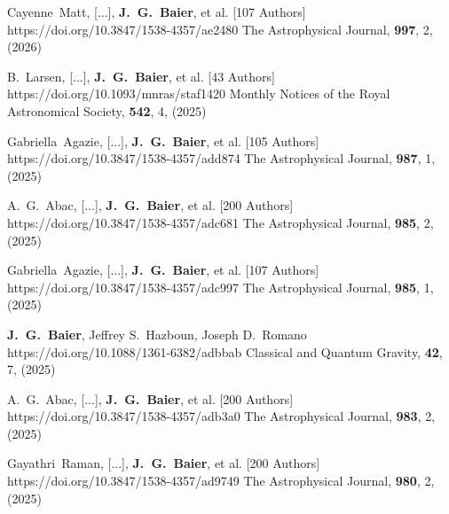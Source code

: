          {Cayenne~{Matt}, [...], \textbf{J.~G.~{Baier}}, et al. [107 Authors]}
         {https://doi.org/10.3847/1538-4357/ae2480}
         {{The Astrophysical Journal}, \textbf{997}, 2, (2026)}

         {B.~{Larsen}, [...], \textbf{J.~G.~{Baier}}, et al. [43 Authors]}
         {https://doi.org/10.1093/mnras/staf1420}
         {{Monthly Notices of the Royal Astronomical Society}, \textbf{542}, 4, (2025)}

         {Gabriella~{Agazie}, [...], \textbf{J.~G.~{Baier}}, et al. [105 Authors]}
         {https://doi.org/10.3847/1538-4357/add874}
         {{The Astrophysical Journal}, \textbf{987}, 1, (2025)}

         {A.~G.~{Abac}, [...], \textbf{J.~G.~{Baier}}, et al. [200 Authors]}
         {https://doi.org/10.3847/1538-4357/adc681}
         {{The Astrophysical Journal}, \textbf{985}, 2, (2025)}

         {Gabriella~{Agazie}, [...], \textbf{J.~G.~{Baier}}, et al. [107 Authors]}
         {https://doi.org/10.3847/1538-4357/adc997}
         {{The Astrophysical Journal}, \textbf{985}, 1, (2025)}

         {\textbf{J.~G.~{Baier}}, Jeffrey S.~{Hazboun}, Joseph D.~{Romano}}
         {https://doi.org/10.1088/1361-6382/adbbab}
         {{Classical and Quantum Gravity}, \textbf{42}, 7, (2025)}

         {A.~G.~{Abac}, [...], \textbf{J.~G.~{Baier}}, et al. [200 Authors]}
         {https://doi.org/10.3847/1538-4357/adb3a0}
         {{The Astrophysical Journal}, \textbf{983}, 2, (2025)}

         {Gayathri~{Raman}, [...], \textbf{J.~G.~{Baier}}, et al. [200 Authors]}
         {https://doi.org/10.3847/1538-4357/ad9749}
         {{The Astrophysical Journal}, \textbf{980}, 2, (2025)}

